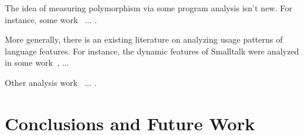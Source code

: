 \documentclass[acmsmall,10pt,review,anonymous]{acmart}\settopmatter{printfolios=true,printccs=false,printacmref=false}
\begin{document}
The idea of measuring polymorphism via some program analysis isn't new.
For instance, some work~\cite{aakerblom2015measuring} ... .

More generally, there is an existing literature on analyzing usage patterns
of language features.  For instance, the dynamic features of Smalltalk were
analyzed in some work~\cite{callau2011howdevelopers}, ...

Other analysis work~\cite{milojkovic2017duck} ... .

\section{Conclusions and Future Work}



\end{document}
